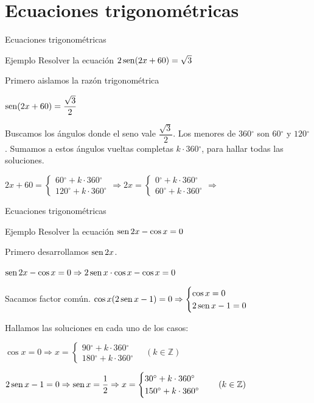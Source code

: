 \documentclass[8pt]{beamer}
\newcommand{\sen}{\mathop{\rm sen}\nolimits}
\newcommand{\Z}{\mathbb{Z}}
\newcommand{\g}{{}^\circ}
\begin{document}
\section{Ecuaciones trigonométricas}

\begin{frame}{Ecuaciones trigonométricas}
\begin{alertblock}{Ejemplo}
Resolver la ecuación $2\sen (2x+60)= \sqrt{3}$
\end{alertblock}
Primero aislamos la razón trigonométrica 

$\sen(2x+60)=\dfrac{\sqrt{3}}{2}$

Buscamos los ángulos donde el seno vale $\dfrac{\sqrt{3}}{2}$. Los menores de $360\g$ son $60\g$ y $120\g$. Sumamos a estos ángulos vueltas completas $k\cdot 360\g$, para hallar todas las soluciones.

$2x+60 = \begin{cases} 60\g+ k\cdot 360\g \\ 120\g+ k\cdot 360\g \end{cases} \Rightarrow 
2x = \begin{cases} 0\g+ k\cdot 360\g \\ 60\g+ k\cdot 360\g \end{cases} \Rightarrow$

\resultado{$x = \begin{cases} 0\g+ k\cdot 180\g \\ 30\g+ k\cdot 180\g \end{cases}\quad (k \in \Z)$}

\end{frame}

\begin{frame}{Ecuaciones trigonométricas}
\begin{alertblock}{Ejemplo}
Resolver la ecuación $\sen 2x - \cos x= 0$
\end{alertblock}
Primero desarrollamos $\sen 2x$.

$\sen 2x - \cos x= 0 \Rightarrow 2\sen x \cdot \cos x -\cos x =0$

Sacamos factor común. $\cos x (2\sen x -1)=0 \Rightarrow \begin{cases} \cos x = 0 \\ 2\sen x-1= 0 \end{cases}$

Hallamos las soluciones en cada uno de los casos:

$\cos x = 0 \Rightarrow x= \begin{cases} 90\g+k\cdot 360\g \\ 180\g+k\cdot 360\g \end{cases} \quad (k \in \Z)$
 
$2\sen x -1= 0 \Rightarrow \sen x=\dfrac{1}{2} \Rightarrow x= \begin{cases} 30\g+k\cdot 360\g \\ 150\g+k\cdot 360\g \end{cases} \quad (k \in \Z)$

\end{frame}
\end{document}
